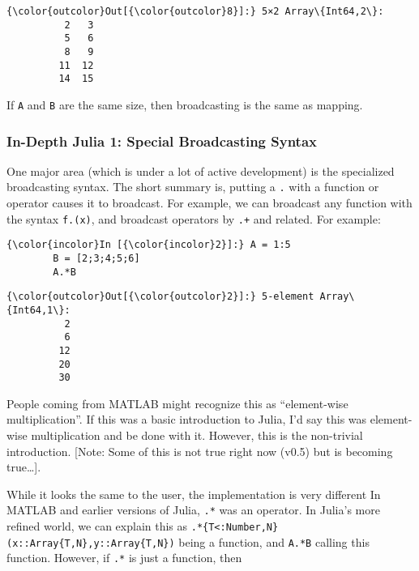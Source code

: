 \documentclass[11pt]{article}
\begin{document}
            \begin{Verbatim}[commandchars=\\\{\}]
{\color{outcolor}Out[{\color{outcolor}8}]:} 5×2 Array\{Int64,2\}:
          2   3
          5   6
          8   9
         11  12
         14  15
\end{Verbatim}
        
    If \texttt{A} and \texttt{B} are the same size, then broadcasting is the
same as mapping.

    \subsubsection{In-Depth Julia 1: Special Broadcasting
Syntax}\label{in-depth-julia-1-special-broadcasting-syntax}

One major area (which is under a lot of active development) is the
specialized broadcasting syntax. The short summary is, putting a
\texttt{.} with a function or operator causes it to broadcast. For
example, we can broadcast any function with the syntax \texttt{f.(x)},
and broadcast operators by \texttt{.+} and related. For example:

    \begin{Verbatim}[commandchars=\\\{\}]
{\color{incolor}In [{\color{incolor}2}]:} A = 1:5
        B = [2;3;4;5;6]
        A.*B
\end{Verbatim}

            \begin{Verbatim}[commandchars=\\\{\}]
{\color{outcolor}Out[{\color{outcolor}2}]:} 5-element Array\{Int64,1\}:
          2
          6
         12
         20
         30
\end{Verbatim}
        
    People coming from MATLAB might recognize this as ``element-wise
multiplication''. If this was a basic introduction to Julia, I'd say
this was element-wise multiplication and be done with it. However, this
is the non-trivial introduction. {[}Note: Some of this is not true right
now (v0.5) but is becoming true\ldots{}{]}.

While it looks the same to the user, the implementation is very
different In MATLAB and earlier versions of Julia, \texttt{.*} was an
operator. In Julia's more refined world, we can explain this as
\texttt{.*\{T\textless{}:Number,N\}(x::Array\{T,N\},y::Array\{T,N\})}
being a function, and \texttt{A.*B} calling this function. However, if
\texttt{.*} is just a function, then
\end{document}
